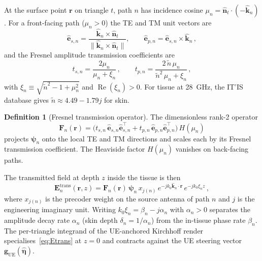 \documentclass[journal,twocolumn,10pt]{IEEEtran}
\theoremstyle{plain}
\theoremstyle{definition}
\newtheorem{definition}[theorem]{Definition}
\theoremstyle{remark}
\newcommand{\EE}{\mathbf{E}}
\newcommand{\Fn}{\mathbf{F}_n}
\newcommand{\psin}{\bm{\psi}_n}
\newcommand{\ntilde}{\tilde{n}}
\DeclareMathOperator{\RE}{Re}
\begin{document}
At the surface point $\bm{r}$ on triangle $t$, path $n$ has
incidence cosine $\mu_n = \hat{\bm{n}}_t \cdot (-\hat{\bm{k}}_n)$.
For a front-facing path ($\mu_n > 0$) the TE and TM unit vectors are
\begin{equation}\label{eq:TE-TM-basis}
  \hat{\bm{e}}_{s,n} = \frac{\hat{\bm{k}}_n \times \hat{\bm{n}}_t}
                            {\|\hat{\bm{k}}_n \times \hat{\bm{n}}_t\|},
  \qquad
  \hat{\bm{e}}_{p,n} = \hat{\bm{e}}_{s,n} \times \hat{\bm{k}}_n\,,
\end{equation}
and the Fresnel amplitude transmission coefficients are
\begin{equation}\label{eq:fresnel-t}
  t_{s,n} = \frac{2\mu_n}{\mu_n + \xi_n}\,, \qquad
  t_{p,n} = \frac{2\,\ntilde\,\mu_n}{\ntilde^2\,\mu_n + \xi_n}\,,
\end{equation}
with $\xi_n \equiv \sqrt{\ntilde^2 - 1 + \mu_n^2}$ and
$\RE(\xi_n) > 0$. For tissue at 28~GHz, the IT'IS database gives
$\ntilde \approx 4.49 - 1.79j$ for skin.

\begin{definition}[Fresnel transmission operator]\label{def:fresnel-op}
The dimensionless rank-2 operator
\begin{equation}\label{eq:Fn-def}
  \Fn(\bm{r}) =
  \bigl(t_{s,n}\,\hat{\bm{e}}_{s,n}\hat{\bm{e}}_{s,n}^{\!\top}
       + t_{p,n}\,\hat{\bm{e}}_{p,n}\hat{\bm{e}}_{p,n}^{\!\top}\bigr)\,H(\mu_n)
\end{equation}
projects $\psin$ onto the local TE and TM directions and scales each
by its Fresnel transmission coefficient. The Heaviside factor
$H(\mu_n)$ vanishes on back-facing paths.
\end{definition}

The transmitted field at depth $z$ inside the tissue is then
\begin{equation}\label{eq:Etrans}
  \EE_n^{\mathrm{trans}}(\bm{r},z)
  = \Fn(\bm{r})\,\psin\,x_{j(n)}\,
    e^{-jk_0\hat{\bm{k}}_n\cdot\bm{r}}\,
    e^{-jk_0\xi_n z}\,,
\end{equation}
where $x_{j(n)}$ is the precoder weight on the source antenna of
path $n$ and $j$ is the engineering imaginary unit. Writing
$k_0\xi_n = \beta_n - j\alpha_n$ with $\alpha_n > 0$ separates the
amplitude decay rate $\alpha_n$ (skin depth $\delta_n = 1/\alpha_n$)
from the in-tissue phase rate $\beta_n$. The per-triangle integrand
of the UE-anchored Kirchhoff render specialises~\eqref{eq:Etrans}
at $z = 0$ and contracts against the UE steering vector
$\bm{g}_{\mathrm{UE}}(\hat{\bm{\eta}})$.
\end{document}
